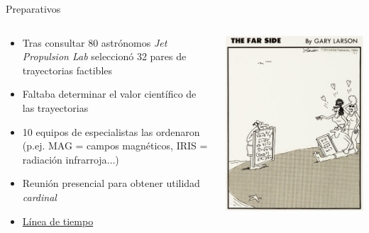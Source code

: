 \documentclass[bigger]{beamer}
\begin{document}
\begin{frame}[label={sec:org0e8f9ab}]{Preparativos}
\begin{columns}
\begin{column}{0.6\columnwidth}
\begin{itemize}
\item Tras consultar 80 astrónomos \emph{Jet Propulsion Lab} seleccionó 32 pares de trayectorias factibles
\item Faltaba determinar el valor científico de las trayectorias
\item 10 equipos de especialistas las ordenaron (p.ej. MAG = campos magnéticos, IRIS = radiación infrarroja\(\ldots\))
\item Reunión presencial para obtener utilidad \emph{cardinal}
\item \href{https://voyager.jpl.nasa.gov/mission/timeline/\#event-the-first-science-meeting}{\ExternalLink Línea de tiempo}
\end{itemize}
\end{column}
\begin{column}{0.4\columnwidth}
\includegraphics[width=\textwidth]{./pics/larson3.jpeg}
\end{column}
\end{columns}
\end{frame}
\end{document}
